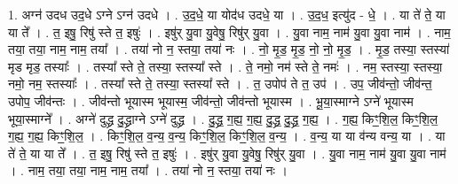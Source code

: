 \documentclass[17pt]{extarticle}
\begin{document}
1. अग्न॑ उदध उद॒धे ऽग्ने ऽग्न॑ उदधे । . उ॒द॒धे॒ या योद॑ध उदधे॒ या । . उ॒द॒ध॒ इत्यु॑द - धे॒ । . या ते॑ ते॒ या या ते᳚ । . त॒ इषु॒ रिषु॑ स्ते त॒ इषुः॑ । . इषु॑र् यु॒वा यु॒वेषु॒ रिषु॑र् यु॒वा । . यु॒वा नाम॒ नाम॑ यु॒वा यु॒वा नाम॑ । . नाम॒ तया॒ तया॒ नाम॒ नाम॒ तया᳚ । . तया॑ नो न॒ स्तया॒ तया॑ नः । . नो॒ मृ॒ड॒ मृ॒ड॒ नो॒ नो॒ मृ॒ड॒ । . मृ॒ड॒ तस्या॒ स्तस्या॑ मृड मृड॒ तस्याः᳚ । . तस्या᳚ स्ते ते॒ तस्या॒ स्तस्या᳚ स्ते । . ते॒ नमो॒ नम॑ स्ते ते॒ नमः॑ । . नम॒ स्तस्या॒ स्तस्या॒ नमो॒ नम॒ स्तस्याः᳚ । . तस्या᳚ स्ते ते॒ तस्या॒ स्तस्या᳚ स्ते । . त॒ उपोप॑ ते त॒ उप॑ । . उप॒ जीव॑न्तो॒ जीव॑न्त॒ उपोप॒ जीव॑न्तः । . जीव॑न्तो भूयास्म भूयास्म॒ जीव॑न्तो॒ जीव॑न्तो भूयास्म । . भू॒या॒स्माग्ने ऽग्ने॑ भूयास्म भूया॒स्माग्ने᳚ । . अग्ने॑ दुद्ध्र दु॒द्ध्राग्ने ऽग्ने॑ दुद्ध्र । . दु॒द्ध्र॒ ग॒ह्य॒ ग॒ह्य॒ दु॒द्ध्र॒ दु॒द्ध्र॒ ग॒ह्य॒ । . ग॒ह्य॒ किꣳ॒॒शि॒ल॒ किꣳ॒॒शि॒ल॒ ग॒ह्य॒ ग॒ह्य॒ किꣳ॒॒शि॒ल॒ । . किꣳ॒॒शि॒ल॒ व॒न्य॒ व॒न्य॒ किꣳ॒॒शि॒ल॒ किꣳ॒॒शि॒ल॒ व॒न्य॒ । . व॒न्य॒ या या व॑न्य वन्य॒ या । . या ते॑ ते॒ या या ते᳚ । . त॒ इषु॒ रिषु॑ स्ते त॒ इषुः॑ । . इषु॑र् यु॒वा यु॒वेषु॒ रिषु॑र् यु॒वा । . यु॒वा नाम॒ नाम॑ यु॒वा यु॒वा नाम॑ । . नाम॒ तया॒ तया॒ नाम॒ नाम॒ तया᳚ । . तया॑ नो न॒ स्तया॒ तया॑ नः । \newline
\end{document}

